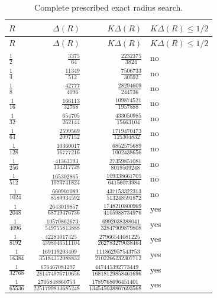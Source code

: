 \documentclass[11pt,a4paper]{article}
\numberwithin{equation}{section}
\theoremstyle{definition}
\theoremstyle{remark}
\begin{document}
\begingroup\small
\renewcommand{\arraystretch}{1.7}
\begin{longtable}{@{}lrrl@{}}
\caption{Complete prescribed exact radius search.}\label{tab:radii}\\
\toprule
$R$ & $\Delta(R)$ & $K\Delta(R)$ & $K\Delta(R)\leq1/2$ \\
\midrule
\endfirsthead
\toprule
$R$ & $\Delta(R)$ & $K\Delta(R)$ & $K\Delta(R)\leq1/2$ \\
\midrule
\endhead
$\frac{1}{2}$ & $\frac{3375}{64}$ & $\frac{2232375}{3824}$ & no \\
$\frac{1}{4}$ & $\frac{11349}{512}$ & $\frac{7506733}{30592}$ & no \\
$\frac{1}{8}$ & $\frac{42777}{4096}$ & $\frac{28294609}{244736}$ & no \\
$\frac{1}{16}$ & $\frac{166113}{32768}$ & $\frac{109874521}{1957888}$ & no \\
$\frac{1}{32}$ & $\frac{654705}{262144}$ & $\frac{433050985}{15663104}$ & no \\
$\frac{1}{64}$ & $\frac{2599569}{2097152}$ & $\frac{1719470473}{125304832}$ & no \\
$\frac{1}{128}$ & $\frac{10360017}{16777216}$ & $\frac{6852575689}{1002438656}$ & no \\
$\frac{1}{256}$ & $\frac{41363793}{134217728}$ & $\frac{27359851081}{8019509248}$ & no \\
$\frac{1}{512}$ & $\frac{165302865}{1073741824}$ & $\frac{109338661705}{64156073984}$ & no \\
$\frac{1}{1024}$ & $\frac{660907089}{8589934592}$ & $\frac{437153322313}{513248591872}$ & no \\
$\frac{1}{2048}$ & $\frac{2643019857}{68719476736}$ & $\frac{1748210800969}{4105988734976}$ & yes \\
$\frac{1}{4096}$ & $\frac{10570862673}{549755813888}$ & $\frac{6992038388041}{32847909879808}$ & yes \\
$\frac{1}{8192}$ & $\frac{42281017425}{4398046511104}$ & $\frac{27966544081225}{262783279038464}$ & yes \\
$\frac{1}{16384}$ & $\frac{169119203409}{35184372088832}$ & $\frac{111862957543753}{2102266232307712}$ & yes \\
$\frac{1}{32768}$ & $\frac{676467081297}{281474976710656}$ & $\frac{447445392773449}{16818129858461696}$ & yes \\
$\frac{1}{65536}$ & $\frac{2705848860753}{2251799813685248}$ & $\frac{1789768696451401}{134545038867693568}$ & yes \\
\bottomrule
\end{longtable}
\endgroup
\end{document}
